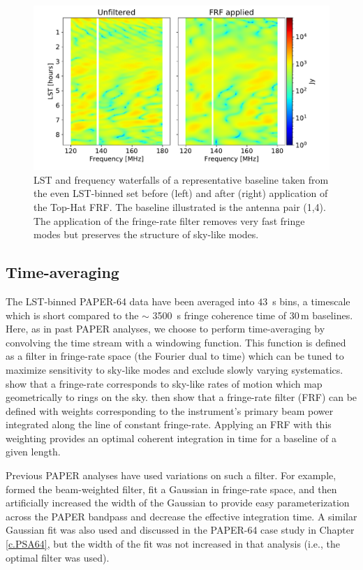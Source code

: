 \begin{figure}[tp]
\centering
\includegraphics[width=.85\textwidth]{plots/data_bl_waterfalls.pdf}
\caption{LST and frequency waterfalls of a representative
baseline taken from the even LST-binned set before (left)
and after (right) application of the Top-Hat FRF.
The baseline illustrated is the antenna pair (1,4). The application of the fringe-rate filter removes very fast
fringe modes but preserves the structure of sky-like
modes.}
\label{fig:waterfalls}
\end{figure}

\subsection{Time-averaging}

The LST-binned PAPER-64 data have been averaged into $43$~s bins, a timescale
which is short compared to the $\sim$ 3500~s fringe coherence time of 30\,m baselines.
Here, as in past PAPER analyses, we choose to perform time-averaging by convolving the time stream with a windowing function.
This function is defined as a filter in fringe-rate space
(the Fourier dual to time) which can be tuned to maximize sensitivity to sky-like modes and exclude slowly varying systematics.
\cite{parsons_backer2009} show that
a fringe-rate corresponds to sky-like rates of motion which map geometrically to
rings on the sky.
\cite{parsons_et_al2016} then show that a fringe-rate filter (FRF) can be defined with weights corresponding
to the instrument's primary beam power integrated along the line of constant fringe-rate. Applying an FRF with this weighting provides an optimal coherent integration in time for a baseline of a given length.

Previous PAPER analyses have used variations on such a filter.  For example, 
formed the beam-weighted filter, fit a Gaussian
in fringe-rate space, and then artificially increased
the width of the Gaussian
to provide easy parameterization across the PAPER
bandpass and decrease the effective integration time.
A similar Gaussian fit was
also used and discussed in the PAPER-64 case study in Chapter \ref{c.PSA64},
but the width of the fit was not increased in that
analysis (i.e., the optimal filter was used).

